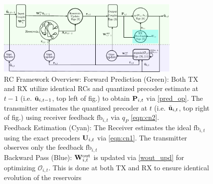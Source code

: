 \documentclass[conference]{IEEEtran}
\begin{document}
{\begin{figure}[ht]
\centering
\includegraphics[width=0.8\textwidth]{images/system2.pdf}
\caption{RC Framework Overview: Forward Prediction (Green): Both TX and RX utilize identical RCs and quantized precoder estimate at $t-1$ (i.e. $\tilde{{\bf u}}_{i,t-1}$, top left of fig.) to obtain ${\bf P}_{i,t}$ via \eqref{pred_op}. The transmitter estimates the quantized precoder at $t$ (i.e. $\tilde{{\bf u}}_{i,t}$, top right of fig.) using receiver feedback $\text{fb}_{i,t}$ via $q_P$ \eqref{eqn:cn2}.
\\Feedback Estimation (Cyan): The Receiver estimates the ideal $\text{fb}_{i,t}$ using the exact precoders ${\bf U}_{i,t}$ via \eqref{eqn:cn1}. The transmitter observes only the feedback $\text{fb}_{i,t}$\\ Backward Pass (Blue): ${\bf W}^{\text{out}}_{i,t}$ is updated via \eqref{wout_upd} for optimizing $\mathcal{O}_{i,t}$. This is done at both TX and RX to ensure identical evolution of the reservoirs}
\label{res_overview}
\end{figure}

}
\end{document}
